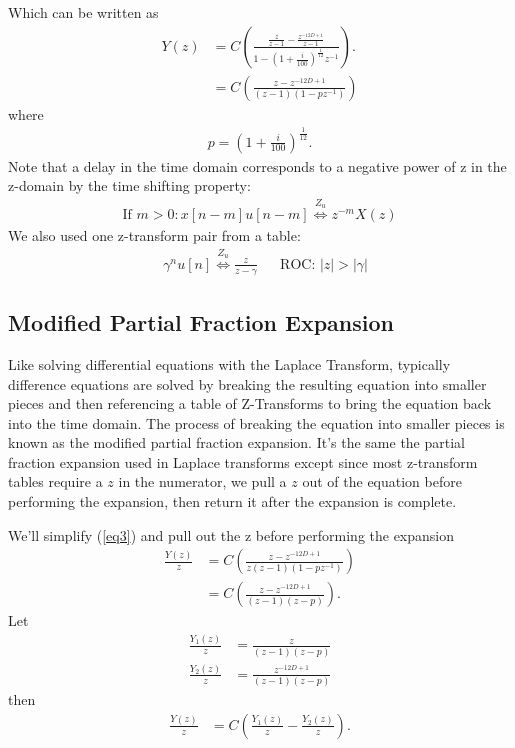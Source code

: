 \documentclass[letterpaper]{article}
\begin{document}
Which can be written as
\begin{align}
	Y(z) &=  C\left(\frac{\frac{z}{z-1} - \frac{z^{-12D+1}}{z-1}}
	{1 - \left(1 + \frac{i}{100} \right)^{\frac{1}{12}}z^{-1}}\right). \label{eq3} \\
	     &=  C\left(\frac{z - z^{-12D+1}}{(z-1)(1 - p z^{-1})}\right)
\end{align}
where 
\begin{align}
	p = \left(1 + \frac{i}{100} \right)^{\frac{1}{12}}.
\end{align}
Note that a delay in the time domain corresponds to a negative power of z in the z-domain by the time shifting property:
\begin{align}
	\text{If }m>0: x[n-m]u[n-m] \stackrel{Z_u}{\Longleftrightarrow} z^{-m} X(z) \label{prop1}
\end{align}
We also used one z-transform pair from a table:
\begin{align}
	&\gamma^nu[n] \stackrel{Z_u}{\Longleftrightarrow} \frac{z}{z-\gamma} & &\text{ROC: } |z|>|\gamma| \label{tp1}
\end{align}

\subsection{Modified Partial Fraction Expansion}
Like solving differential equations with the Laplace Transform, typically difference equations are solved by breaking the resulting equation into smaller pieces and then referencing a table of Z-Transforms to bring the equation back into the time domain. The process of breaking the equation into smaller pieces is known as the modified partial fraction expansion. It's the same the partial fraction expansion used in Laplace transforms except since most z-transform tables require a $z$ in the numerator, we pull a $z$ out of the equation before performing the expansion, then return it after the expansion is complete.

We'll simplify (\ref{eq3}) and pull out the z before performing the expansion
\begin{align}
	\frac{Y(z)}{z} &= C \left( \frac{z - z^{-12D+1}}{z(z-1)(1 - pz^{-1})} \right) \\
	&= C \left( \frac{z - z^{-12D+1}}{(z-1)(z - p)} \right).
\end{align}
Let
\begin{align}
	\frac{Y_1(z)}{z} &= \frac{z}{(z-1)(z - p)} \\
	\frac{Y_2(z)}{z} &= \frac{z^{-12D+1}}{(z-1)(z - p)}
\end{align}
then
\begin{align}
	\frac{Y(z)}{z} &= C \left( \frac{Y_1(z)}{z} - \frac{Y_2(z)}{z} \right).
\end{align}
\end{document}
